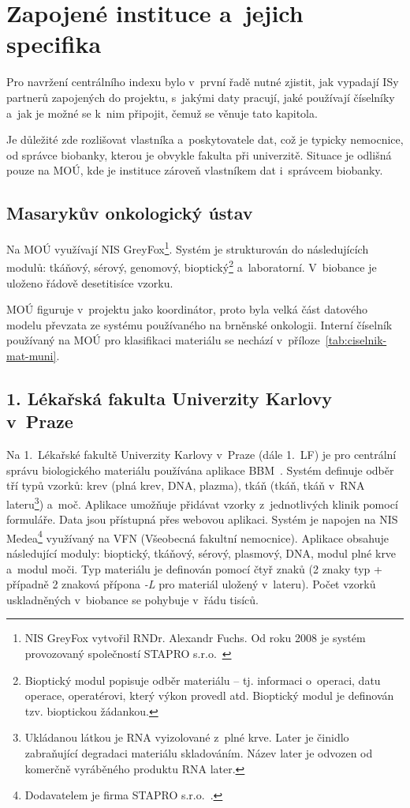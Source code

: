 \documentclass[11pt, final, oneside]{fithesis2}
\begin{document}
\section{Zapojené instituce a~jejich specifika}\label{sec:instituce}
Pro navržení centrálního indexu bylo v~první řadě nutné zjistit, jak vypadají ISy partnerů zapojených do projektu, s~jakými daty pracují, jaké používají číselníky a~jak je možné se k~nim připojit, čemuž se věnuje tato kapitola.

Je důležité zde rozlišovat vlastníka a~poskytovatele dat, což je typicky nemocnice, od správce biobanky, kterou je obvykle fakulta při univerzitě. Situace je odlišná pouze na MOÚ, kde je instituce zároveň vlastníkem dat i~správcem biobanky.

\subsection{Masarykův onkologický ústav}
Na MOÚ využívají NIS GreyFox\footnote{NIS GreyFox vytvořil RNDr. Alexandr Fuchs. Od roku 2008 je systém provozovaný společností STAPRO s.r.o.~\cite{GreyFox}}. Systém je strukturován do následujících modulů: tkáňový, sérový, genomový, bioptický\footnote{Bioptický modul popisuje odběr materiálu -- tj. informaci o~operaci, datu operace, operatérovi, který výkon provedl atd. Bioptický modul je definován tzv. bioptickou žádankou.} a~laboratorní. V~biobance je uloženo řádově desetitisíce vzorku.

MOÚ figuruje v~projektu jako koordinátor, proto byla velká část datového modelu převzata ze systému používaného na brněnské onkologii. Interní číselník používaný na MOÚ pro klasifikaci materiálu se nechází v~příloze~\ref{tab:ciselnik-mat-muni}.

\subsection{1. Lékařská fakulta Univerzity Karlovy v~Praze}

Na 1.~Lékařské fakultě Univerzity Karlovy v~Praze (dále 1.~LF) je pro centrální správu biologického materiálu používána aplikace BBM~\cite{1LF_BBM}. Systém definuje odběr tří typů vzorků: krev (plná krev, DNA, plazma), tkáň (tkáň, tkáň v~RNA lateru\footnote{Ukládanou látkou je RNA vyizolované z~plné krve. Later je činidlo zabraňující degradaci materiálu skladováním. Název later je odvozen od komerčně vyráběného produktu RNA later.}) a~moč. Aplikace umožňuje přidávat vzorky z~jednotlivých klinik pomocí formuláře. Data jsou přístupná přes webovou aplikaci.
Systém je napojen na NIS Medea\footnote{Dodavatelem je firma STAPRO s.r.o.~\cite{Medea}.} využívaný na VFN (Všeobecná fakultní nemocnice). 
Aplikace obsahuje následující moduly:  bioptický, tkáňový, sérový, plasmový, DNA, modul plné krve a~modul moči.
Typ materiálu je definován pomocí čtyř znaků (2 znaky typ + případně 2 znaková přípona \textit{-L} pro materiál uložený v~lateru). Počet vzorků uskladněných v~biobance se pohybuje v~řádu tisíců.
\end{document}
